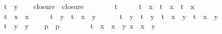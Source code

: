 \begin{isabellebody}
\ \ \ \ t{\isacharcircum}{}\ {\isacharasterisk}\ y{}{\isacharcircum}{}{\isachardoublequoteclose}\isanewline
\isanewline
\ \ \isamarkupfalse%
\ closure{}\ \ {\isachardoublequoteopen}closure{}\ {\isacharequal}\ \isanewline
\ \ \ \ {\isacharminus}{}\ {\isacharplus}\ t{\isacharcircum}{}\ {\isacharplus}\ {\isacharparenleft}{}\ {\isacharminus}\ {}\ {\isacharasterisk}\ t{\isacharcircum}{}{\isacharparenright}\ {\isacharasterisk}\ x{}{\isacharcircum}{}\ {\isacharplus}\ t{\isacharcircum}{}\ {\isacharasterisk}\ x{}{\isacharcircum}{}\ {\isacharplus}\ t{\isacharcircum}{}\ {\isacharasterisk}\ x{}{\isacharcircum}{}\ {\isacharminus}\isanewline
\ \ \ \ t{\isacharcircum}{}\ {\isacharasterisk}\ x{}{\isacharcircum}{}\ {\isacharasterisk}\ x{}{\isacharcircum}{}\ {\isacharplus}\ {\isacharparenleft}{}\ {\isacharminus}\ {}\ {\isacharasterisk}\ t{\isacharcircum}{}{\isacharparenright}\ {\isacharasterisk}\ y{}{\isacharcircum}{}\ {\isacharminus}\ t{\isacharcircum}{}\ {\isacharasterisk}\ x{}{\isacharcircum}{}\ {\isacharasterisk}\ y{}{\isacharcircum}{}\ {\isacharplus}\ \isanewline
\ \ \ \ t{\isacharcircum}{}\ {\isacharasterisk}\ y{}{\isacharcircum}{}\ {\isacharplus}\ t{\isacharcircum}{}\ {\isacharasterisk}\ y{}{\isacharcircum}{}\ {\isacharminus}\ t{\isacharcircum}{}\ {\isacharasterisk}\ x{}{\isacharcircum}{}\ {\isacharasterisk}\ y{}{\isacharcircum}{}\ {\isacharplus}\ t{\isacharcircum}{}\ {\isacharasterisk}\ x{}{\isacharcircum}{}\ {\isacharasterisk}\ y{}{\isacharcircum}{}\ {\isacharminus}\ \isanewline
\ \ \ \ t{\isacharcircum}{}\ {\isacharasterisk}\ y{}{\isacharcircum}{}\ {\isacharasterisk}\ y{}{\isacharcircum}{}{\isachardoublequoteclose}\isanewline
\isanewline
\ \ \isamarkupfalse%
\ p\ \ {\isachardoublequoteopen}p\ {\isacharequal}\ \isanewline
\ \ \ \ {\isacharminus}{}\ {\isacharasterisk}\ t{\isacharcircum}{}\ {\isacharasterisk}\ {\isacharparenleft}x{}{\isacharcircum}{}\ {\isacharasterisk}\ x{}{\isacharcircum}{}\ {\isacharasterisk}\ y{}{\isacharcircum}{}\ {\isacharminus}x{}{\isacharcircum}{}\ {\isacharasterisk}\ x{}{\isacharcircum}{}\ {\isacharasterisk}\ y{}{\isacharcircum}{}\ {\isacharplus}\ \isanewline

\end{isabellebody}

